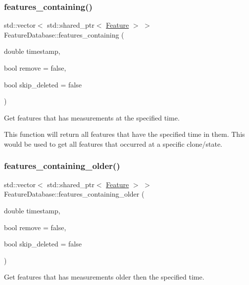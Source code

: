 \subsubsection{\texorpdfstring{features\+\_\+containing()}{features\_containing()}}
{\footnotesize\ttfamily std\+::vector$<$ std\+::shared\+\_\+ptr$<$ \hyperlink{classov__core_1_1Feature}{Feature} $>$ $>$ Feature\+Database\+::features\+\_\+containing (\begin{DoxyParamCaption}\item[{double}]{timestamp,  }\item[{bool}]{remove = {\ttfamily false},  }\item[{bool}]{skip\+\_\+deleted = {\ttfamily false} }\end{DoxyParamCaption})}



Get features that has measurements at the specified time. 

This function will return all features that have the specified time in them. This would be used to get all features that occurred at a specific clone/state. \mbox{\label{classov__core_1_1FeatureDatabase_a5cdb62171c42c8787daec984a8cebe15}} 
\subsubsection{\texorpdfstring{features\+\_\+containing\+\_\+older()}{features\_containing\_older()}}
{\footnotesize\ttfamily std\+::vector$<$ std\+::shared\+\_\+ptr$<$ \hyperlink{classov__core_1_1Feature}{Feature} $>$ $>$ Feature\+Database\+::features\+\_\+containing\+\_\+older (\begin{DoxyParamCaption}\item[{double}]{timestamp,  }\item[{bool}]{remove = {\ttfamily false},  }\item[{bool}]{skip\+\_\+deleted = {\ttfamily false} }\end{DoxyParamCaption})}



Get features that has measurements older then the specified time. 

